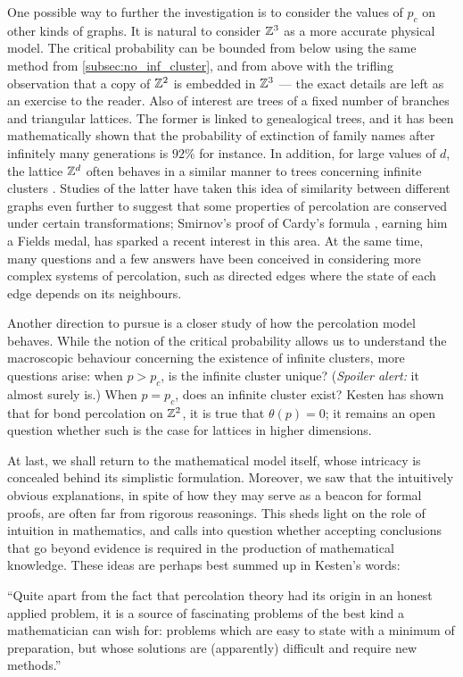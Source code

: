 \documentclass[a4paper, 12pt]{article}
\begin{document}
One possible way to further the investigation is to consider the values of $p_c$ on other kinds of graphs. It is natural to consider $\mathbb{Z}^3$ as a more accurate physical model. The critical probability can be bounded from below using the same method from \cref{subsec:no_inf_cluster}, and from above with the trifling observation that a copy of $\mathbb{Z}^2$ is embedded in $\mathbb{Z}^3$ --- the exact details are left as an exercise to the reader. Also of interest are trees of a fixed number of branches and triangular lattices. The former is linked to genealogical trees, and it has been mathematically shown that the probability of extinction of family names after infinitely many generations is $92\%$ \autocite[]{gennes_2000} for instance. In addition, for large values of $d$, the lattice $\mathbb{Z}^d$ often behaves in a similar manner to trees concerning infinite clusters \autocite[]{gennes_2000}. Studies of the latter have taken this idea of similarity between different graphs even further to suggest that some properties of percolation are conserved under certain transformations; Smirnov's proof of Cardy's formula \autocite*[1]{smirnov_2001}, earning him a Fields medal, has sparked a recent interest in this area. At the same time, many questions and a few answers have been conceived in considering more complex systems of percolation, such as directed edges where the state of each edge depends on its neighbours.

Another direction to pursue is a closer study of how the percolation model behaves. While the notion of the critical probability allows us to understand the macroscopic behaviour concerning the existence of infinite clusters, more questions arise: when $p > p_c$, is the infinite cluster unique? (\textit{Spoiler alert:} it almost surely is.) When $p = p_c$, does an infinite cluster exist? Kesten \autocite*[42]{kesten_1980} has shown that for bond percolation on $\mathbb{Z}^2$, it is true that $\theta(p) = 0$; it remains an open question whether such is the case for lattices in higher dimensions.

At last, we shall return to the mathematical model itself, whose intricacy is concealed behind its simplistic formulation. Moreover, we saw that the intuitively obvious explanations, in spite of how they may serve as a beacon for formal proofs, are often far from rigorous reasonings. This sheds light on the role of intuition in mathematics, and calls into question whether accepting conclusions that go beyond evidence is required in the production of mathematical knowledge. These ideas are perhaps best summed up in Kesten's words:

\begin{displayquote}
``Quite apart from the fact that percolation theory had its origin in an honest applied problem, it is a source of fascinating problems of the best kind a mathematician can wish for: problems which are easy to state with a minimum of preparation, but whose solutions are (apparently) difficult and require new methods.''
\end{displayquote}

\printbibliography
\thispagestyle{empty}
\end{document}
